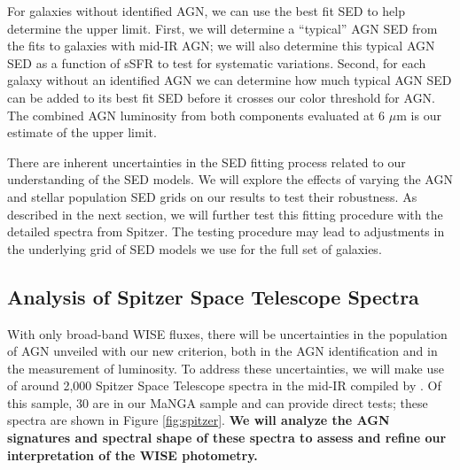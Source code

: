 \documentclass[12pt, preprint]{hacked-aastex}
\begin{document}
For galaxies without identified AGN, we can use the best fit SED to
help determine the upper limit. First, we will determine a ``typical''
AGN SED from the fits to galaxies with mid-IR AGN; we will also
determine this typical AGN SED as a function of sSFR to test for
systematic variations. Second, for each galaxy without an identified
AGN we can determine how much typical AGN SED can be added to its
best fit SED before it crosses our color threshold for AGN. The combined
AGN luminosity from both components evaluated at 6 $\mu$m is our 
estimate of the upper limit.

There are inherent uncertainties in the SED fitting process related
to our understanding of the SED models. We will explore the
effects of varying the AGN and stellar population SED grids on our
results to test their robustness.  As described in the next section,
we will further test this fitting procedure with the detailed spectra
from Spitzer. The testing procedure may lead to adjustments in the
underlying grid of SED models we use for the full set of galaxies.


\subsection{Analysis of Spitzer Space Telescope Spectra}
\label{sec:spitzer}

With only broad-band WISE fluxes, there will be uncertainties in the
population of AGN unveiled with our new criterion, both in the AGN
identification and in the measurement of luminosity. To address these
uncertainties, we will make use of around 2,000 Spitzer Space
Telescope spectra in the mid-IR compiled by \cite{lambrides}. Of this
sample, 30 are in our MaNGA sample and can provide direct tests; these
spectra are shown in  Figure \ref{fig:spitzer}.  
{\bf We will analyze the AGN signatures and spectral shape 
of these spectra to assess and refine our interpretation 
of the WISE photometry.}
\end{document}

